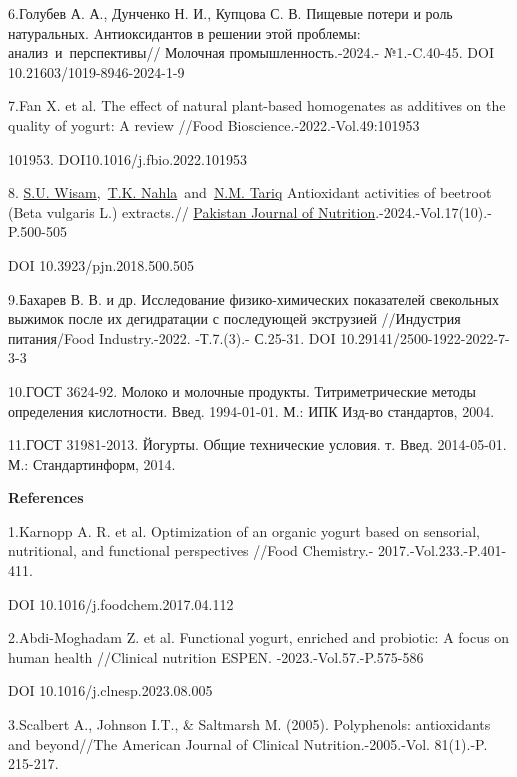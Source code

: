 6.Голубев А. А., Дунченко Н. И., Купцова С. В. Пищевые потери и роль
натуральных. Aнтиоксидантов в решении этой проблемы:
анализ~и~перспективы// Молочная промышленность.-2024.- №1.-C.40-45. DOI
10.21603/1019-8946-2024-1-9

7.Fan X. et al. The effect of natural plant-based homogenates as
additives on the quality of yogurt: A review //Food
Bioscience.-2022.-Vol.49:101953

101953. DOI10.1016/j.fbio.2022.101953

8.
\href{https://ascidatabase.com/author.php?ascicat=ALL&author=S.U.&mid=&last=Wisam}{S.U.
Wisam},~\href{https://ascidatabase.com/author.php?ascicat=ALL&author=T.K.&mid=&last=Nahla}{T.K.
Nahla}~and~\href{https://ascidatabase.com/author.php?ascicat=ALL&author=N.M.&mid=&last=Tariq}{N.M.
Tariq} Antioxidant activities of beetroot (Beta vulgaris L.) extracts.//
\href{https://www.researchgate.net/journal/Pakistan-Journal-of-Nutrition-1680-5194?_tp=eyJjb250ZXh0Ijp7ImZpcnN0UGFnZSI6InB1YmxpY2F0aW9uIiwicGFnZSI6InB1YmxpY2F0aW9uIn19}{Pakistan
Journal of Nutrition}.-2024.-Vol.17(10).-P.500-505~

DOI 10.3923/pjn.2018.500.505

9.Бахарев В. В. и др. Исследование физико-химических показателей
свекольных выжимок после их дегидратации с последующей экструзией
//Индустрия питания/Food Industry.-2022. -Т.7.(3).- С.25-31. DOI
10.29141/2500-1922-2022-7-3-3

10.ГОСТ 3624-92. Молоко и молочные продукты. Титриметрические методы
определения кислотности. Введ. 1994-01-01. М.: ИПК Изд-во стандартов,
2004.

11.ГОСТ 31981-2013. Йогурты. Общие технические условия. т. Введ.
2014-05-01. М.: Стандартинформ, 2014.

{\bfseries References}

1.Karnopp A. R. et al. Optimization of an organic yogurt based on
sensorial, nutritional, and functional perspectives //Food Chemistry.-
2017.-Vol.233.-P.401-411.

DOI 10.1016/j.foodchem.2017.04.112

2.Abdi-Moghadam Z. et al. Functional yogurt, enriched and probiotic: A
focus on human health //Clinical nutrition ESPEN.
-2023.-Vol.57.-P.575-586

DOI 10.1016/j.clnesp.2023.08.005

3.Scalbert A., Johnson I.T., \& Saltmarsh M. (2005). Polyphenols:
antioxidants and beyond//The American Journal of Clinical
Nutrition.-2005.-Vol. 81(1).-P. 215-217.

